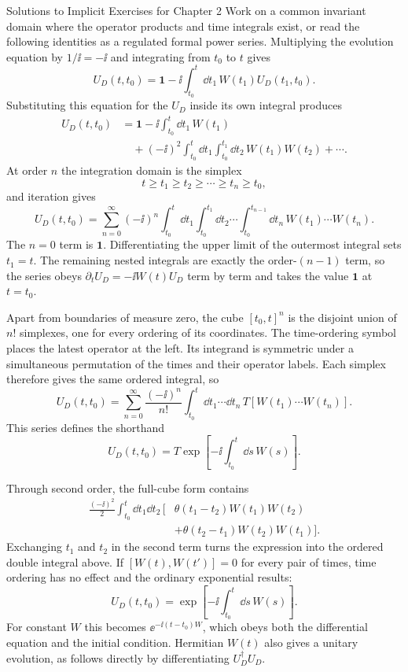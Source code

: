 \begin{bankssolutions}{Solutions to Implicit Exercises for Chapter 2}
Work on a common invariant domain where the operator products and time
integrals exist, or read the following identities as a regulated formal power
series. Multiplying the evolution equation by $1/\ii=-\ii$ and integrating from $t_0$
to $t$ gives
\[
  U_D(t,t_0)=\mathbf1-\ii\int_{t_0}^{t}\dd t_1\,
  W(t_1)U_D(t_1,t_0).
\]
Substituting this equation for the $U_D$ inside its own integral produces
\begin{align*}
  U_D(t,t_0)
  &=\mathbf1-\ii\int_{t_0}^{t}\dd t_1\,W(t_1)\\
  &\quad+(-\ii)^2\int_{t_0}^{t}\dd t_1
    \int_{t_0}^{t_1}\dd t_2\,W(t_1)W(t_2)+\cdots.
\end{align*}
At order $n$ the integration domain is the simplex
\[
  t\geq t_1\geq t_2\geq\cdots\geq t_n\geq t_0,
\]
and iteration gives
\[
  U_D(t,t_0)=\sum_{n=0}^{\infty}(-\ii)^n
  \int_{t_0}^{t}\dd t_1\int_{t_0}^{t_1}\dd t_2\cdots
  \int_{t_0}^{t_{n-1}}\dd t_n\,W(t_1)\cdots W(t_n).
\]
The $n=0$ term is $\mathbf1$.
Differentiating the upper limit of the outermost integral sets $t_1=t$.
The remaining nested integrals are exactly the order-$(n-1)$ term, so the
series obeys $\partial_t U_D=-\ii W(t)U_D$ term by term and takes the value
$\mathbf1$ at $t=t_0$.

Apart from boundaries of measure zero, the cube $[t_0,t]^n$ is the disjoint
union of $n!$ simplexes, one for every ordering of its coordinates. The
time-ordering symbol places the latest operator at the left. Its integrand is
symmetric under a simultaneous permutation of the times and their operator
labels. Each simplex therefore gives the same ordered integral, so
\[
  U_D(t,t_0)=\sum_{n=0}^{\infty}\frac{(-\ii)^n}{n!}
  \int_{t_0}^{t}\dd t_1\cdots\dd t_n\,
  T\!\left[W(t_1)\cdots W(t_n)\right].
\]
This series defines the shorthand
\[
  U_D(t,t_0)=T\exp\!\left[-\ii\int_{t_0}^{t}\dd s\,W(s)\right].
\]

Through second order, the full-cube form contains
\begin{align*}
  \frac{(-\ii)^2}{2}
  \int_{t_0}^{t}\dd t_1\dd t_2\,
  \bigl[&\theta(t_1-t_2)W(t_1)W(t_2)\\
        &+\theta(t_2-t_1)W(t_2)W(t_1)\bigr].
\end{align*}
Exchanging $t_1$ and $t_2$ in the second term turns the expression into the
ordered double integral above. If $[W(t),W(t')]=0$ for every pair of times,
time ordering has no effect and the ordinary exponential results:
\[
  U_D(t,t_0)=\exp\!\left[-\ii\int_{t_0}^{t}\dd s\,W(s)\right].
\]
For constant $W$ this becomes $\ee^{-\ii(t-t_0)W}$, which obeys both the
differential equation and the initial condition. Hermitian $W(t)$ also gives a
unitary evolution, as follows directly by differentiating $U_D^\dagger U_D$.


\end{bankssolutions}
